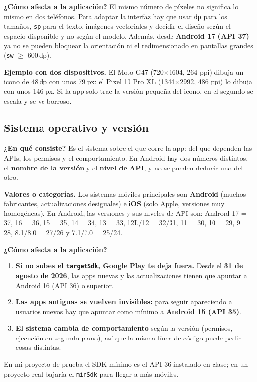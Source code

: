 \documentclass[11pt,a4paper]{article}
\newcommand{\code}[1]{\texttt{\color{navylight}#1}}
\newcommand{\campo}[1]{\textbf{\color{navy}#1}}
\begin{document}
	\campo{¿Cómo afecta a la aplicación?}
	El mismo número de píxeles no significa lo mismo en dos teléfonos. Para adaptar la interfaz hay que usar \code{dp} para los tamaños, \code{sp} para el texto, imágenes vectoriales y decidir el diseño según el espacio disponible y no según el modelo. Además, desde \textbf{Android 17 (API 37)} ya no se pueden bloquear la orientación ni el redimensionado en pantallas grandes (\code{sw} $\geq$ 600\,dp).

	\campo{Ejemplo con dos dispositivos.} El Moto G47 (720$\times$1604, 264 ppi) dibuja un icono de 48\,dp con unos 79 px; el Pixel 10 Pro XL (1344$\times$2992, 486 ppi) lo dibuja con unos 146 px. Si la app solo trae la versión pequeña del icono, en el segundo se escala y se ve borroso.

	\subsection{Sistema operativo y versión}

	\campo{¿En qué consiste?}
	Es el sistema sobre el que corre la app: del que dependen las APIs, los permisos y el comportamiento. En Android hay dos números distintos, el \textbf{nombre de la versión} y el \textbf{nivel de API}, y no se pueden deducir uno del otro.

	\campo{Valores o categorías.} Los sistemas móviles principales son \textbf{Android} (muchos fabricantes, actualizaciones desiguales) e \textbf{iOS} (solo Apple, versiones muy homogéneas). En Android, las versiones y sus niveles de API son: Android 17 = 37, 16 = 36, 15 = 35, 14 = 34, 13 = 33, 12L/12 = 32/31, 11 = 30, 10 = 29, 9 = 28, 8.1/8.0 = 27/26 y 7.1/7.0 = 25/24.

	\campo{¿Cómo afecta a la aplicación?}
	\begin{enumerate}[leftmargin=*,itemsep=0.15em]
		\item \textbf{Si no subes el \code{targetSdk}, Google Play te deja fuera.} Desde el \textbf{31 de agosto de 2026}, las apps nuevas y las actualizaciones tienen que apuntar a Android 16 (API 36) o superior.
		\item \textbf{Las apps antiguas se vuelven invisibles:} para seguir apareciendo a usuarios nuevos hay que apuntar como mínimo a \textbf{Android 15 (API 35)}.
		\item \textbf{El sistema cambia de comportamiento} según la versión (permisos, ejecución en segundo plano), así que la misma línea de código puede pedir cosas distintas.
	\end{enumerate}
	En mi proyecto de prueba el SDK mínimo es el API 36 instalado en clase; en un proyecto real bajaría el \code{minSdk} para llegar a más móviles.
\end{document}
